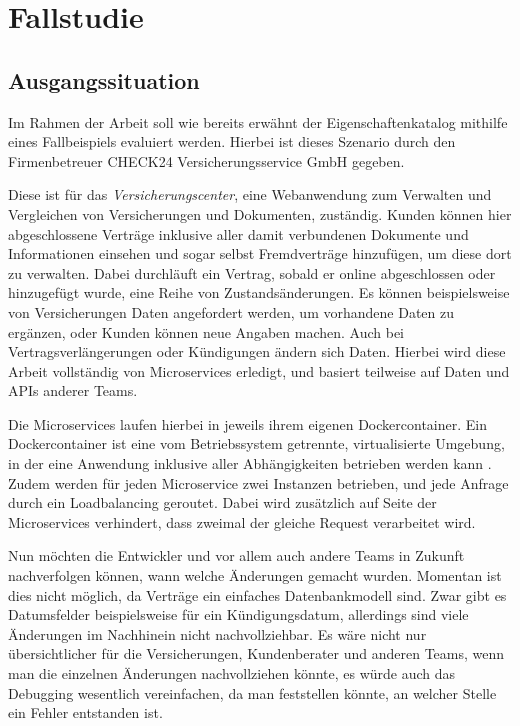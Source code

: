 \chapter{Fallstudie}
\label{part:check24}
\section{Ausgangssituation}
Im Rahmen der Arbeit soll wie bereits erwähnt der Eigenschaftenkatalog mithilfe
eines Fallbeispiels evaluiert werden.
Hierbei ist dieses Szenario durch den Firmenbetreuer CHECK24
Versicherungsservice GmbH gegeben.

Diese ist für das \textit{Versicherungscenter}, eine Webanwendung zum
Verwalten und Vergleichen von Versicherungen und Dokumenten, zuständig.
Kunden können hier abgeschlossene Verträge inklusive aller damit verbundenen
Dokumente und Informationen einsehen und sogar selbst Fremdverträge hinzufügen,
um diese dort zu verwalten.
Dabei durchläuft ein Vertrag, sobald er online abgeschlossen oder hinzugefügt
wurde, eine Reihe von Zustandsänderungen. Es können beispielsweise von
Versicherungen Daten angefordert werden, um vorhandene Daten zu ergänzen, oder
Kunden können neue Angaben machen. Auch bei Vertragsverlängerungen oder
Kündigungen ändern sich Daten. Hierbei wird diese Arbeit vollständig von
Microservices erledigt, und basiert teilweise auf Daten und APIs anderer Teams.

Die Microservices laufen hierbei in jeweils ihrem eigenen Dockercontainer.
Ein Dockercontainer ist eine vom Betriebssystem getrennte, virtualisierte
Umgebung, in der eine Anwendung inklusive aller Abhängigkeiten betrieben werden
kann \cite{docker:online}.
Zudem werden für jeden Microservice zwei Instanzen betrieben, und jede Anfrage
durch ein Loadbalancing geroutet. Dabei wird zusätzlich auf Seite der
Microservices verhindert, dass zweimal der gleiche Request verarbeitet wird.

Nun möchten die Entwickler und vor allem auch andere Teams in Zukunft
nachverfolgen können, wann welche Änderungen gemacht wurden. Momentan ist dies
nicht möglich, da Verträge ein einfaches Datenbankmodell sind. Zwar gibt es
Datumsfelder beispielsweise für ein Kündigungsdatum, allerdings sind viele
Änderungen im Nachhinein nicht nachvollziehbar. Es wäre nicht nur übersichtlicher
für die Versicherungen, Kundenberater und anderen Teams, wenn man die einzelnen
Änderungen nachvollziehen könnte, es würde auch das Debugging wesentlich
vereinfachen, da man feststellen könnte, an welcher Stelle ein Fehler entstanden
ist.

